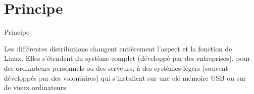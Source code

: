 \documentclass{beamer}
\begin{document}
\section{Principe}
\begin{frame}{Principe}
\begin{block}
  \raggedright    
  \raggedright Les différentes distributions changent entièrement l'aspect et la fonction de Linux. Elles s'étendent du système complet (développé par des entreprises), pour des ordinateurs personnels ou des serveurs, à des systèmes légers (souvent développés par des volontaires) qui s'installent sur une clé mémoire USB ou sur de vieux ordinateurs.
\end{block}
\end{frame}



\end{document}
